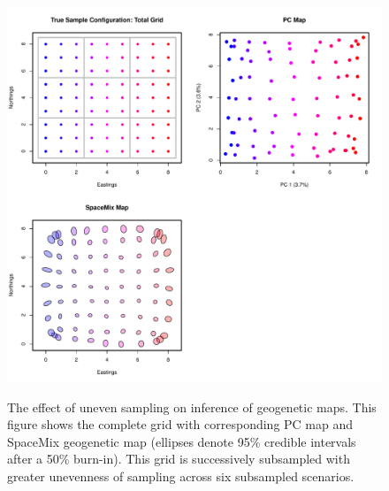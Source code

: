 \documentclass[10pt,letterpaper]{article}
\begin{document}
\begin{figure}
\centering
	{\includegraphics[width=\textwidth]{../figs/sims/total_grid.pdf}}
	\caption{The effect of uneven sampling on inference of geogenetic maps.  
			This figure shows the complete grid with corresponding PC map
			and SpaceMix geogenetic map 
			(ellipses denote 95\% credible intervals after a 50\% burn-in).  
			This grid is successively subsampled with greater unevenness of
			sampling across six subsampled scenarios.}\label{sfig:uneven_sampling_total_grid}
\end{figure}
\end{document}
